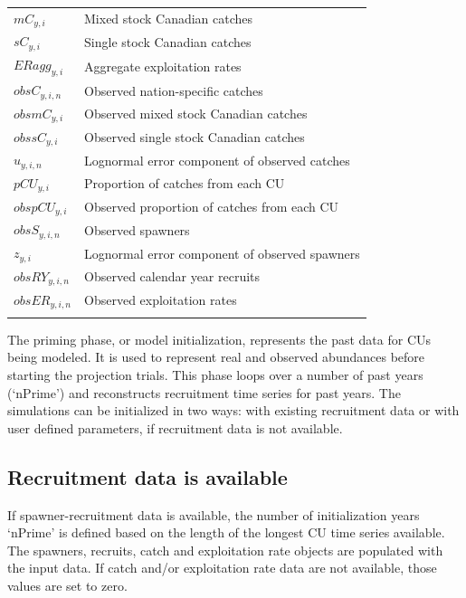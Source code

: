 \documentclass[11pt]{book}
\begin{document}
\begin{longtable}[]{l p{13.5cm}}
${mC}_{y,i}$ & Mixed stock Canadian catches \\
${sC}_{y,i}$ & Single stock Canadian catches\\
$ERagg_{y,i}$ & Aggregate exploitation rates\\
${obsC}_{y,i,n}$ & Observed nation-specific catches \\
${obsmC}_{y,i}$ & Observed mixed stock Canadian catches\\
${obssC}_{y,i}$ & Observed single stock Canadian catches\\
$u_{y,i,n}$ & Lognormal error component of observed catches\\
$pCU_{y,i}$ & Proportion of catches from each CU\\
$obspCU_{y,i}$ & Observed proportion of catches from each CU \\
${obsS}_{y,i,n}$ & Observed spawners \\
$z_{y,i}$ & Lognormal error component of observed spawners\\
${obsRY}_{y,i,n}$ & Observed calendar year recruits \\
${obsER}_{y,i,n}$ & Observed exploitation rates \\
\hline
\label{tab:modtab}
\end{longtable}
\hypertarget{model-priming}{%
\label{model-priming}}

The priming phase, or model initialization, represents the past data for CUs being modeled. It is used to represent real and observed abundances before starting the projection trials. This phase loops over a number of past years (`nPrime') and reconstructs recruitment time series for past years. The simulations can be initialized in two ways: with existing recruitment data or with user defined parameters, if recruitment data is not available.

\hypertarget{recruitment-data-is-available}{%
\subsection{Recruitment data is available}\label{recruitment-data-is-available}}

If spawner-recruitment data is available, the number of initialization years `nPrime' is defined based on the length of the longest CU time series available. The spawners, recruits, catch and exploitation rate objects are populated with the input data. If catch and/or exploitation rate data are not available, those values are set to zero.
\end{document}

